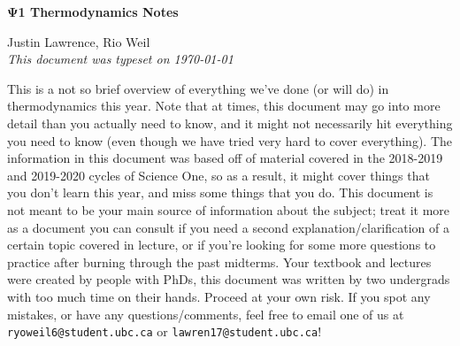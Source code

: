 \documentclass[12pt]{article}
\begin{document}
\begin{tcolorbox}
  \begin{center}
  \begin{Large}
    \textbf{$\boldsymbol{\Psi}$1 Thermodynamics Notes} \\
    \vspace{5pt}
  \end{Large}
  \begin{large}
        Justin Lawrence, Rio Weil \\
\vspace{5pt}
    \emph{This document was typeset on \today}
  \end{large}
  \end{center}
\end{tcolorbox}
\begin{center}
This is a not so brief overview of everything we've done (or will do) in thermodynamics this year. Note that at times, this document may go into more detail than you actually need to know, and it might not necessarily hit everything you need to know (even though we have tried very hard to cover everything). The information in this document was based off of material covered in the 2018-2019 and 2019-2020 cycles of Science One, so as a result, it might cover things that you don't learn this year, and miss some things that you do. This document is not meant to be your main source of information about the subject; treat it more as a document you can consult if you need a second explanation/clarification of a certain topic covered in lecture, or if you're looking for some more questions to practice after burning through the past midterms. Your textbook and lectures were created by people with PhDs, this document was written by two undergrads with too much time on their hands. Proceed at your own risk.
\newline
\newline
If you spot any mistakes, or have any questions/comments, feel free to email one of us at \texttt{ryoweil6@student.ubc.ca} or \texttt{lawren17@student.ubc.ca}!
\end{center}
\newpage
\tableofcontents
\newpage

\newpage

\newpage

\newpage

\end{document}
